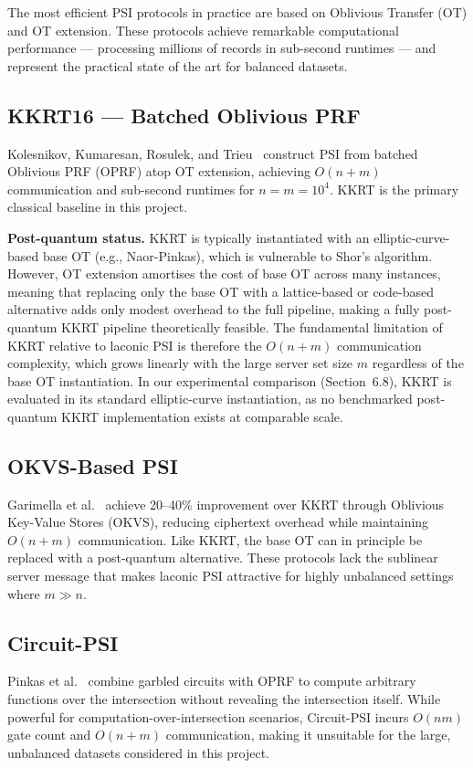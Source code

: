The most efficient PSI protocols in practice are based on Oblivious Transfer (OT)
and OT extension. These protocols achieve remarkable computational performance ---
processing millions of records in sub-second runtimes --- and represent the
practical state of the art for balanced datasets.

\subsection{KKRT16 --- Batched Oblivious PRF}
Kolesnikov, Kumaresan, Rosulek, and Trieu~\cite{kolesnikov2016kkrt} construct
PSI from batched Oblivious PRF (OPRF) atop OT extension, achieving $O(n + m)$
communication and sub-second runtimes for $n = m = 10^4$. KKRT is the primary
classical baseline in this project.

\textbf{Post-quantum status.} KKRT is typically instantiated with an
elliptic-curve-based base OT (e.g., Naor-Pinkas), which is vulnerable to Shor's
algorithm. However, OT extension amortises the cost of base OT across many instances,
meaning that replacing only the base OT with a lattice-based or code-based
alternative adds only modest overhead to the full pipeline, making a fully
post-quantum KKRT pipeline theoretically feasible. The fundamental limitation of
KKRT relative to laconic PSI is therefore the $O(n + m)$ communication complexity,
which grows linearly with the large server set size $m$ regardless of the base OT
instantiation. In our experimental comparison (Section~6.8), KKRT is evaluated in
its standard elliptic-curve instantiation, as no benchmarked post-quantum KKRT
implementation exists at comparable scale.

\subsection{OKVS-Based PSI}
Garimella et al.~\cite{garimella2023okvs} achieve 20--40\% improvement over KKRT
through Oblivious Key-Value Stores (OKVS), reducing ciphertext overhead while
maintaining $O(n + m)$ communication. Like KKRT, the base OT can in principle be
replaced with a post-quantum alternative. These protocols lack the sublinear
server message that makes laconic PSI attractive for highly unbalanced settings
where $m \gg n$.

\subsection{Circuit-PSI}
Pinkas et al.~\cite{pinkas2019circuit} combine garbled circuits with OPRF to
compute arbitrary functions over the intersection without revealing the intersection
itself. While powerful for computation-over-intersection scenarios, Circuit-PSI
incurs $O(nm)$ gate count and $O(n + m)$ communication, making it unsuitable for
the large, unbalanced datasets considered in this project.

